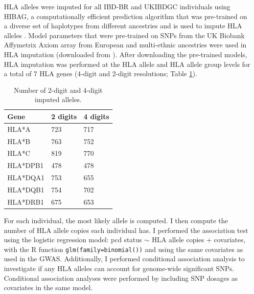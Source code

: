 HLA alleles were imputed for all IBD-BR and UKIBDGC individuals using HIBAG, a computationally efficient prediction algorithm that was pre-trained on a diverse set of haplotypes from different ancestries and is used to impute HLA alleles \cite{Zheng2014-mj}. Model parameters that were pre-trained on SNPs from the UK Biobank Affymetrix Axiom array from European and multi-ethnic ancestries were used in HLA imputation (downloaded from \cite{hibag-models-docs}). After downloading the pre-trained models, HLA imputation was performed at the HLA allele and HLA allele group levels  for a total of 7 HLA genes (4-digit and 2-digit resolutions; Table \ref{table:hla_allele_num}). 

\begin{table}[H]
  \centering
  \caption{Number of 2-digit and 4-digit imputed alleles.}
  \label{table:hla_allele_num}
  \begin{tabular}{|l|l|l|}
  \hline
  Gene     & 2 digits & 4 digits \\ \hline
  HLA*A    & 723      & 717      \\ \hline
  HLA*B    & 763      & 752      \\ \hline
  HLA*C    & 819      & 770      \\ \hline
  HLA*DPB1 & 478      & 478      \\ \hline
  HLA*DQA1 & 753      & 655      \\ \hline
  HLA*DQB1 & 754      & 702      \\ \hline
  HLA*DRB1 & 675      & 653      \\ \hline
  \end{tabular}
  \end{table}
For each individual, the most likely allele is computed. I then compute the number of HLA allele copies each individual has. I performed the association test using the logistic regression model: pcd status $\sim$ HLA allele copies + covariates, with the R function \Verb+glm(family=binomial())+ and using the same covariates as used in the GWAS. Additionally, I performed conditional association analysis to investigate if any HLA alleles can account for genome-wide significant SNPs. Conditional association analyses were performed by including SNP dosages as covariates in the same model. 


